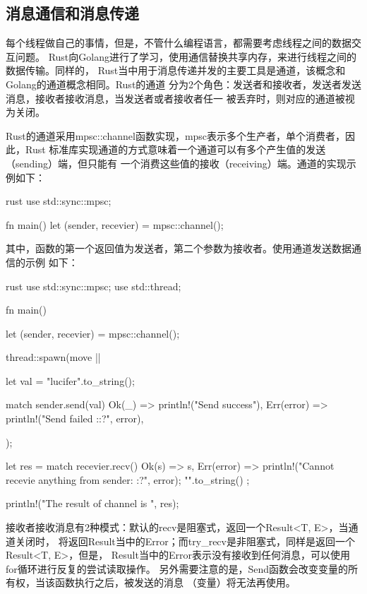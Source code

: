 \subsection{消息通信和消息传递}
每个线程做自己的事情，但是，不管什么编程语言，都需要考虑线程之间的数据交互问题。
Rust向Golang进行了学习，使用通信替换共享内存，来进行线程之间的数据传输。同样的，
Rust当中用于消息传递并发的主要工具是通道，该概念和Golang的通道概念相同。Rust的通道
分为2个角色：发送者和接收者，发送者发送消息，接收者接收消息，当发送者或者接收者任一
被丢弃时，则对应的通道被视为关闭。

Rust的通道采用mpsc::channel函数实现，mpsc表示多个生产者，单个消费者，因此，Rust
标准库实现通道的方式意味着一个通道可以有多个产生值的发送（sending）端，但只能有
一个消费这些值的接收（receiving）端。通道的实现示例如下：
\begin{code-block}{rust}
use std::sync::mpsc;

fn main() {
    let (sender, recevier) = mpsc::channel();
}
\end{code-block}
其中，函数的第一个返回值为发送者，第二个参数为接收者。使用通道发送数据通信的示例
如下：
\begin{code-block}{rust}
use std::sync::mpsc;
use std::thread;

fn main() {
    let (sender, recevier) = mpsc::channel();

    thread::spawn(move || {
        let val = "lucifer".to_string();

        match sender.send(val) {
            Ok(_) => println!("Send success"),
            Err(error) => println!("Send failed :{:?}", error),
        }

    });

    let res = match recevier.recv() {
        Ok(s) => s,
        Err(error) => {
            println!("Cannot recevie anything from sender: {:?}", error);
            "".to_string()
        }
    };

    println!("The result of channel is {}", res);
}
\end{code-block}
接收者接收消息有2种模式：默认的recv是阻塞式，返回一个Result<T, E>，当通道关闭时，
将返回Result当中的Error；而try\_recv是非阻塞式，同样是返回一个Result<T, E>，但是，
Result当中的Error表示没有接收到任何消息，可以使用for循环进行反复的尝试读取操作。
另外需要注意的是，Send函数会改变变量的所有权，当该函数执行之后，被发送的消息
（变量）将无法再使用。

